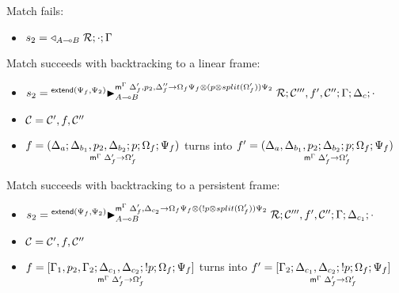 
\item Match fails:
\begin{itemize}[leftmargin=\secondm]
   \item $s_2 = \contstate{A \lolli B}{\rulestk}{\cdot}{\Gamma}$
\end{itemize}

\item Match succeeds with backtracking to a linear frame:
\begin{itemize}[leftmargin=\secondm]
   \item $s_2 = \matstateb{A \lolli B}{\rulestk}{\lstack{C'''}, f',
      \lstack{C''}}{\Gamma}{\Delta_c}{\cdot}{\Delta'_f, p_2, \Delta''_f \rightarrow
      \Omega_f\Psi_f \otimes (p \otimes split(\Omega'_f))\Psi_2}{\m{extend}(\Psi_f, \Psi_2)}$

   \item $\lstack{C} = \lstack{C'}, f, \lstack{C''}$

   \item $f = \lframe{\Delta_a}{\Delta_{b_1}, p_2,
      \Delta_{b_2}}{p}{\Omega_f; \Psi_f}{\Delta_f'}{\Omega_f'}$
   turns into $f' = \lframe{\Delta_a, \Delta_{b_1},
      p_2}{\Delta_{b_2}}{p}{\Omega_f; \Psi_f}{\Delta'_f}{\Omega'_f}$
\end{itemize}

\item Match succeeds with backtracking to a persistent frame:
\begin{itemize}[leftmargin=\secondm]
   \item $s_2 = \matstateb{A \lolli B}{\rulestk}{\lstack{C'''}, f',
      \lstack{C''}}{\Gamma}{\Delta_{c_1}}{\cdot}{\Delta'_f, \Delta_{c_2}
         \rightarrow \Omega_f\Psi_f \otimes (\bang p \otimes
      split(\Omega'_f))\Psi_2}{\m{extend}(\Psi_f, \Psi_2)}$
   \item $\lstack{C} = \lstack{C'}, f, \lstack{C''}$

   \item $f = \pframe{\Gamma_1, p_2,
      \Gamma_2}{\Delta_{c_1}, \Delta_{c_2}}{\bang p}{\Omega_f; \Psi_f}{\Delta'_f}{\Omega'_f}$
   turns into $f' = \pframe{\Gamma_2}{\Delta_{c_1},
      \Delta_{c_2}}{\bang p}{\Omega_f; \Psi_f}{\Delta'_f}{\Omega'_f}$
\end{itemize}
